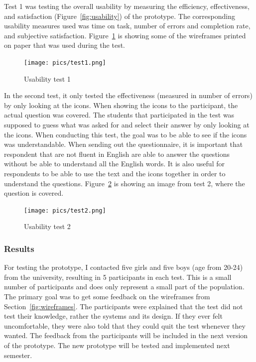   Test 1 was testing the overall usability by measuring the efficiency, effectiveness, and satisfaction (Figure~\ref{fig:usability}) of the prototype. The corresponding usability measures used was time on task, number of errors and completion rate, and subjective satisfaction. Figure~\ref{fig:test1} is showing some of the wireframes printed on paper that was used during the test. 

    \begin{figure}[H]
      \centering
      \texttt{[image: pics/test1.png]}
      \caption{Usability test 1}
      \label{fig:test1}
    \end{figure}

  In the second test, it only tested the effectiveness (measured in number of errors) by only looking at the icons. When showing the icons to the participant, the actual question was covered. The students that participated in the test was supposed to guess what was asked for and select their answer by only looking at the icons. When conducting this test, the goal was to be able to see if the icons was understandable. When sending out the questionnaire, it is important that respondent that are not fluent in English are able to answer the questions without be able to understand all the English words. It is also useful for respondents to be able to use the text and the icons together in order to understand the questions. Figure~\ref{fig:test2} is showing an image from test 2, where the question is covered. 

    \begin{figure}[H]
      \centering
      \texttt{[image: pics/test2.png]}
      \caption{Usability test 2}
      \label{fig:test2}
    \end{figure}

  \subsubsection*{Results}

  For testing the prototype, I contacted five girls and five boys (age from 20-24) from the university, resulting in 5 participants in each test. This is a small number of participants and does only represent a small part of the population. The primary goal was to get some feedback on the wireframes from Section~\ref{fig:wireframes}. The participants were explained that the test did not test their knowledge, rather the systems and its design. If they ever felt uncomfortable, they were also told that they could quit the test whenever they wanted. The feedback from the participants will be included in the next version of the prototype. The new prototype will be tested and implemented next semester.

